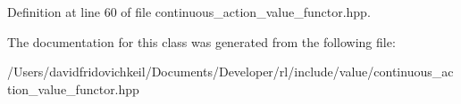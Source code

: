 Definition at line 60 of file continuous\+\_\+action\+\_\+value\+\_\+functor.\+hpp.



The documentation for this class was generated from the following file\+:\begin{DoxyCompactItemize}
\item 
/\+Users/davidfridovichkeil/\+Documents/\+Developer/rl/include/value/continuous\+\_\+action\+\_\+value\+\_\+functor.\+hpp\end{DoxyCompactItemize}
